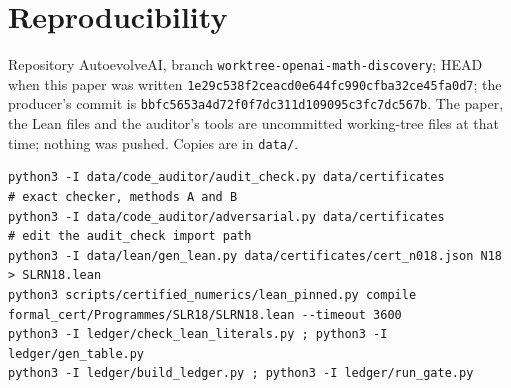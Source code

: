 \documentclass[10pt]{article}
\begin{document}
\section{Reproducibility}\label{sec:repro}
Repository AutoevolveAI, branch \texttt{worktree-openai-math-discovery}; HEAD when this paper was written \texttt{1e29c538f2ceacd0e644fc990cfba32ce45fa0d7}; the producer's commit is \texttt{bbfc5653a4d72f0f7dc311d109095c3fc7dc567b}. The paper, the Lean files and the auditor's tools are uncommitted working-tree files at that time; nothing was pushed. Copies are in \texttt{data/}.
\begin{lstlisting}[basicstyle=\ttfamily\scriptsize]
python3 -I data/code_auditor/audit_check.py data/certificates            # exact checker, methods A and B
python3 -I data/code_auditor/adversarial.py data/certificates            # edit the audit_check import path
python3 -I data/lean/gen_lean.py data/certificates/cert_n018.json N18 > SLRN18.lean
python3 scripts/certified_numerics/lean_pinned.py compile formal_cert/Programmes/SLR18/SLRN18.lean --timeout 3600
python3 -I ledger/check_lean_literals.py ; python3 -I ledger/gen_table.py
python3 -I ledger/build_ledger.py ; python3 -I ledger/run_gate.py
\end{lstlisting}

\appendix
\end{document}
